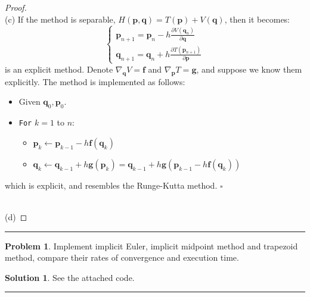 \documentclass[a4paper, 10pt]{article}
\theoremstyle{definition}
\newtheorem{problem}{Problem}
\theoremstyle{hSol}
\newtheorem*{solution}{Solution}
\begin{document}
\begin{proof}
~\\
(c) If the method is separable, $H(\bm{p}, \bm{q}) = T(\bm{p}) + V(\bm{q})$, then it becomes:
\begin{equation}
  \begin{cases}
    \bm{p}_{n+1} = \bm{p}_n - h \frac{\partial V(\bm{q}_n)}{\partial \bm{q}} \\
    \bm{q}_{n+1} = \bm{q}_n + h \frac{\partial T(\bm{p}_{n+1})}{\partial \bm{p}}
  \end{cases}
\end{equation}
is an explicit method. Denote $\nabla_{\bm{q}} V = \bm{f}$ and $\nabla_{\bm{p}}T = \bm{g}$, and suppose we know them explicitly. The method is implemented as follows:
\begin{itemize}
  \item[] Given $\bm{q}_0, \bm{p}_0$.
  \item[] \texttt{For} $k = 1$ to $n$:
  \begin{itemize}
    \item[] $\bm{p}_k \leftarrow \bm{p}_{k-1} - h \bm{f}(\bm{q}_k)$
    \item[] $\bm{q}_k \leftarrow \bm{q}_{k-1} + h \bm{g}(\bm{p}_k) = \bm{q}_{k-1} + h \bm{g}(\bm{p}_{k-1} - h \bm{f}(\bm{q}_k))$
  \end{itemize}
\end{itemize}
which is explicit, and resembles the Runge-Kutta method. $\square$

~\\
(d)
\end{proof} 
\noindent\rule{16cm}{0.4pt}

\begin{problem} Implement implicit Euler, implicit midpoint method and trapezoid method, compare their rates of convergence and execution time. 

\end{problem}
\begin{solution} 
See the attached code.
\end{solution} 
\noindent\rule{16cm}{0.4pt}
\end{document}

